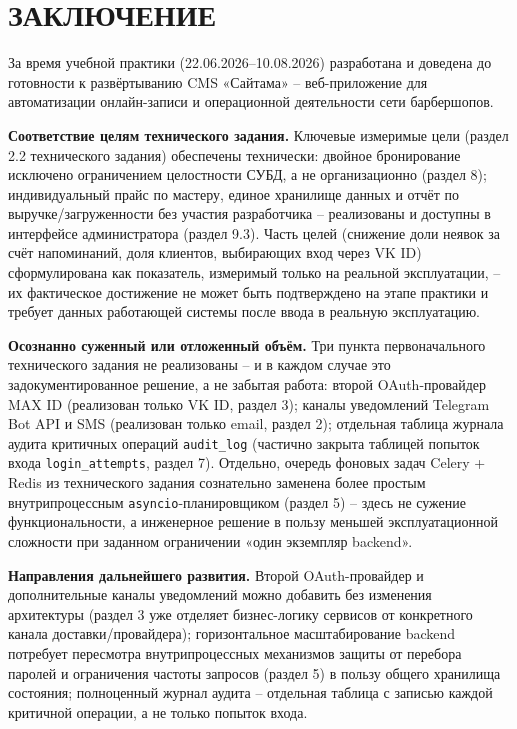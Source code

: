 \section*{ЗАКЛЮЧЕНИЕ}

За время учебной практики (22.06.2026--10.08.2026) разработана и доведена
до готовности к развёртыванию CMS «Сайтама» -- веб-приложение для
автоматизации онлайн-записи и операционной деятельности сети
барбершопов.

\textbf{Соответствие целям технического задания.} Ключевые измеримые цели
(раздел 2.2 технического задания) обеспечены технически: двойное
бронирование исключено ограничением целостности СУБД, а не
организационно (раздел 8); индивидуальный прайс по мастеру, единое
хранилище данных и отчёт по выручке/загруженности без участия
разработчика -- реализованы и доступны в интерфейсе администратора
(раздел 9.3). Часть целей (снижение доли неявок за счёт напоминаний,
доля клиентов, выбирающих вход через VK ID) сформулирована как
показатель, измеримый только на реальной эксплуатации, -- их фактическое
достижение не может быть подтверждено на этапе практики и требует данных
работающей системы после ввода в реальную эксплуатацию.

\textbf{Осознанно суженный или отложенный объём.} Три пункта
первоначального технического задания не реализованы -- и в каждом случае
это задокументированное решение, а не забытая работа: второй OAuth-провайдер
MAX ID (реализован только VK ID, раздел 3); каналы уведомлений
Telegram Bot API и SMS (реализован только email, раздел 2); отдельная
таблица журнала аудита критичных операций \texttt{audit\_log} (частично
закрыта таблицей попыток входа \texttt{login\_attempts}, раздел 7).
Отдельно, очередь фоновых задач Celery + Redis из технического задания
сознательно заменена более простым внутрипроцессным
\texttt{asyncio}-планировщиком (раздел 5) -- здесь не сужение
функциональности, а инженерное решение в пользу меньшей эксплуатационной
сложности при заданном ограничении «один экземпляр backend».

\textbf{Направления дальнейшего развития.} Второй OAuth-провайдер и
дополнительные каналы уведомлений можно добавить без изменения
архитектуры (раздел 3 уже отделяет бизнес-логику сервисов от конкретного
канала доставки/провайдера); горизонтальное масштабирование backend
потребует пересмотра внутрипроцессных механизмов защиты от перебора
паролей и ограничения частоты запросов (раздел 5) в пользу общего
хранилища состояния; полноценный журнал аудита -- отдельная таблица с
записью каждой критичной операции, а не только попыток входа.

